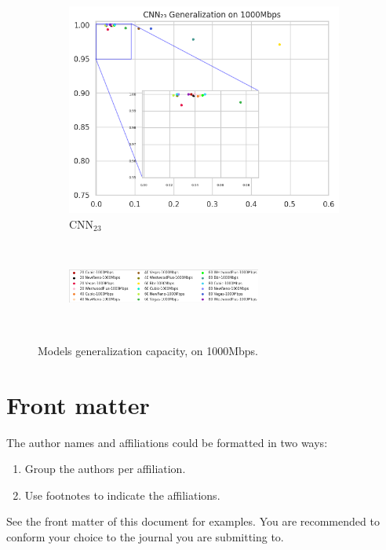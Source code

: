 \documentclass[a4paper,fleqn]{cas-sc}
\begin{document}
\begin{figure}[h!]
\begin{minipage}[t]{0.46\textwidth}
\begin{subfigure}[t]{0.33\textwidth}
			\includegraphics[draft=false, width=\textwidth]{./figs/Generalizacao-CNN23-1000Mbps.png} 
			\caption{CNN$_{23}$}
			\label{fig:Generalizacao-CNN23-1000Mbps}
		\end{subfigure}%
		~

		\begin{subfigure}[t]{\textwidth}
			\centering
			\includegraphics[draft=false, width=0.7\textwidth]{./figs/legenta_1000Mbps.png} 
			\label{fig:legenda-10Mbps}
		\end{subfigure}%
		~
	\hfill
	\caption{Models generalization capacity, on 1000Mbps.\hspace{8.5cm}}
	\label{fig:Generalizacao-1000Mbps}
	\end{minipage}
\end{figure}
\section{Front matter}

The author names and affiliations could be formatted in two ways:
\begin{enumerate}[(1)]
\item Group the authors per affiliation.
\item Use footnotes to indicate the affiliations.
\end{enumerate}
See the front matter of this document for examples. 
You are recommended to conform your choice to the journal you 
are submitting to.
\end{document}
